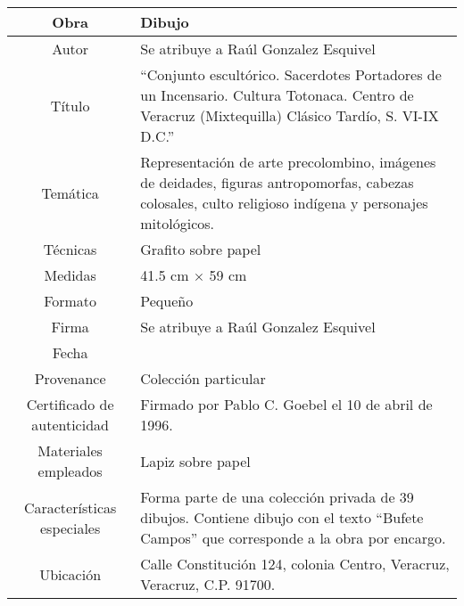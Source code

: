 \documentclass[10pt,letter]{report}
\begin{document}
\begin{table}[H]
\centering
\begin{tabular}{|c|m{}|}
\hline
Obra& Dibujo	\\
\hline
Autor & Se atribuye a Ra\'ul Gonzalez Esquivel\\
\hline
T\'itulo & ``Conjunto escult\'orico. Sacerdotes Portadores de un Incensario. Cultura Totonaca. Centro de Veracruz (Mixtequilla) Cl\'asico Tard\'io, S. VI-IX D.C.''\\
\hline
Tem\'atica & Representaci\'on de arte precolombino, im\'agenes de deidades, figuras antropomorfas, cabezas colosales, culto religioso ind\'igena y personajes mitol\'ogicos.\\
\hline
T\'ecnicas &Grafito sobre papel \\
\hline
Medidas & 41.5 cm $\times$ 59 cm \\
\hline
 Formato & Peque\~no \\
 \hline
 Firma & Se atribuye a Ra\'ul Gonzalez Esquivel\\ 
 \hline
  Fecha & \\
 \hline
 Provenance & Colecci\'on particular\\
 \hline
 Certificado de autenticidad& Firmado por Pablo C. Goebel el 10 de abril de 1996.  \\
 \hline 
  Materiales empleados & Lapiz sobre papel\\
 \hline
 Caracter\'isticas especiales & Forma parte de una colecci\'on privada de 39 dibujos. 
Contiene dibujo con el texto ``Bufete Campos'' que corresponde a la obra por encargo. \\
\hline 
Ubicaci\'on & Calle Constituci\'on 124, colonia Centro, Veracruz, Veracruz, C.P. 91700.\\
\hline

\end{tabular}
\end{table}
\end{document}
